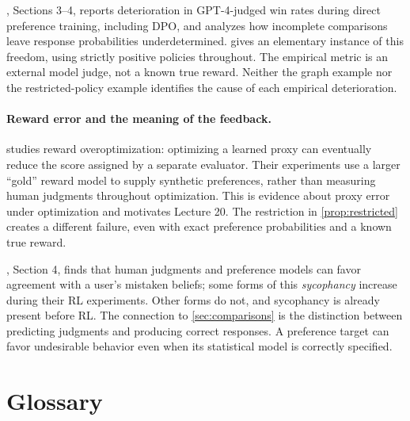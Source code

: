 \documentclass[11pt,twoside]{article}
\theoremstyle{definition}
\theoremstyle{remark}
\begin{document}
\citet{rafailov2024overoptimization}, Sections 3--4, reports deterioration
in GPT-4-judged win rates during direct preference training, including DPO,
and analyzes how incomplete comparisons leave response probabilities
underdetermined.  gives an elementary instance
of this freedom, using strictly positive policies throughout. The empirical
metric is an external model judge, not a known true reward. Neither the
graph example nor the restricted-policy example identifies the cause of
each empirical deterioration.

\paragraph{Reward error and the meaning of the feedback.}
\citet{gao2023} studies reward overoptimization: optimizing a learned proxy
can eventually reduce the score assigned by a separate evaluator. Their
experiments use a larger ``gold'' reward model to supply synthetic
preferences, rather than measuring human judgments throughout optimization.
This is evidence about proxy error under optimization and motivates Lecture
20. The restriction in \cref{prop:restricted} creates a different failure,
even with exact preference probabilities and a known true reward.

\citet{sharma2024}, Section 4, finds that human judgments and preference
models can favor agreement with a user's mistaken beliefs; some forms of
this \emph{sycophancy} increase during their RL experiments. Other forms do
not, and sycophancy is already present before RL. The connection to
\cref{sec:comparisons} is the distinction between predicting judgments and
producing correct responses. A preference target can favor undesirable
behavior even when its statistical model is correctly specified.

\section*{Glossary}
\end{document}

